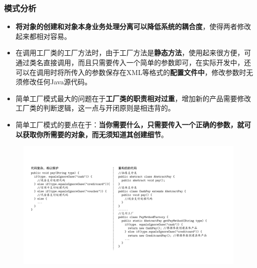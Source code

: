 \subsubsection{模式分析}
\begin{itemize}
    \item \textbf{将对象的创建和对象本身业务处理分离可以降低系统的耦合度}，使得两者修改起来都相对容易。
    \item 在调用工厂类的工厂方法时，由于工厂方法是\textbf{静态方法}，使用起来很方便，可通过类名直接调用，而且只需要传入一个简单的参数即可，在实际开发中，还可以在调用时将所传入的参数保存在XML等格式的\textbf{配置文件中}，修改参数时无须修改任何Java源代码。
    \item 简单工厂模式最大的问题在于\textbf{工厂类的职责相对过重}，增加新的产品需要修改工厂类的判断逻辑，这一点与开闭原则是相违背的。
    \item 简单工厂模式的要点在于：\textbf{当你需要什么，只需要传入一个正确的参数，就可以获取你所需要的对象，而无须知道其创建细节}。
\end{itemize}
\begin{figure}[H]
    \vspace{-0.5em}
	\centering
	\includegraphics[width=\textwidth]{images/简单工厂模式分析.pdf}
    \vspace{-1.5em}
\end{figure}


